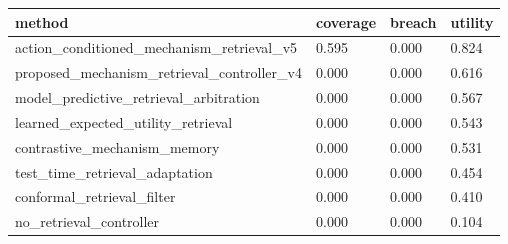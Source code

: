 \begin{tabular}{llll}
\toprule
method & coverage & breach & utility \\
\midrule
action\_conditioned\_mechanism\_retrieval\_v5 & 0.595 & 0.000 & 0.824 \\
proposed\_mechanism\_retrieval\_controller\_v4 & 0.000 & 0.000 & 0.616 \\
model\_predictive\_retrieval\_arbitration & 0.000 & 0.000 & 0.567 \\
learned\_expected\_utility\_retrieval & 0.000 & 0.000 & 0.543 \\
contrastive\_mechanism\_memory & 0.000 & 0.000 & 0.531 \\
test\_time\_retrieval\_adaptation & 0.000 & 0.000 & 0.454 \\
conformal\_retrieval\_filter & 0.000 & 0.000 & 0.410 \\
no\_retrieval\_controller & 0.000 & 0.000 & 0.104 \\
\bottomrule
\end{tabular}
